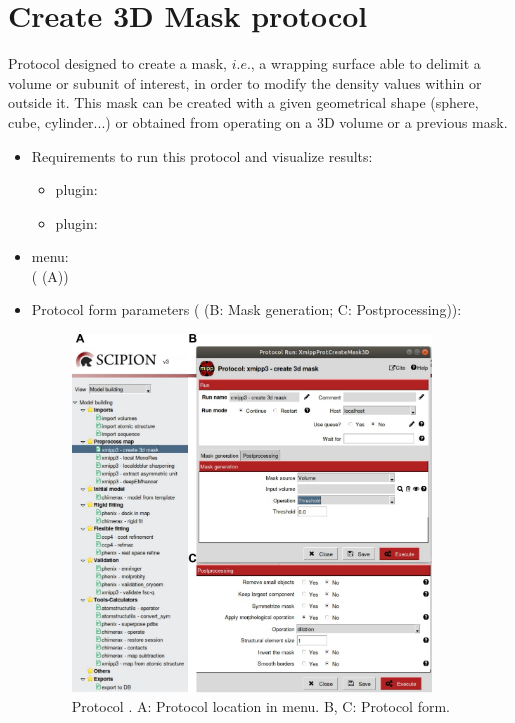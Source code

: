 \section{Create 3D Mask protocol}
\label{app:create3DMask}%

Protocol designed to create a mask, $i.e.$, a wrapping surface able to delimit a volume or subunit of interest, in order to modify the density values within or outside it. This mask can be created with a given geometrical shape (sphere, cube, cylinder...) or obtained from operating on a 3D volume or a previous mask.

\begin{itemize}
 \item Requirements to run this protocol and visualize results:
    \begin{itemize}
        \item \scipion plugin: 
        \item \scipion plugin: 
    \end{itemize}
 \item \scipion menu:\\
   ( (A))
  
 \item Protocol form parameters ( (B: Mask generation; C: Postprocessing)):
  
    \begin{figure}[H]
     \centering 
     \captionsetup{width=.7\linewidth} 
     \includegraphics[width=0.90\textwidth]{Images_appendix/Fig206}
     \caption{Protocol . A: Protocol location in \scipion menu. B, C: Protocol form.}
     \label{fig:create3DMask_1}
    \end{figure}
    

\end{itemize}
